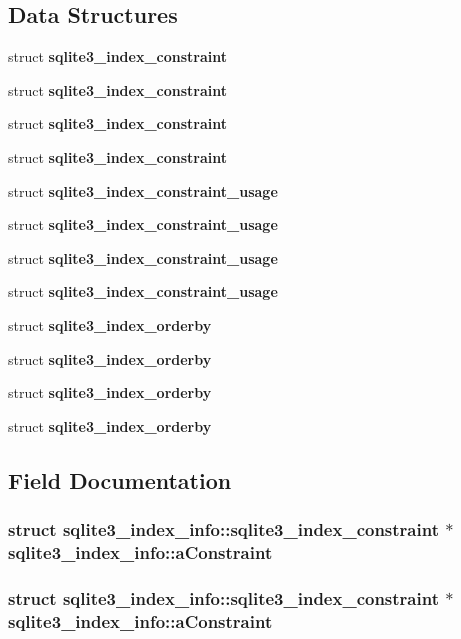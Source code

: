 \subsection*{Data Structures}
\begin{CompactItemize}
\item 
struct \bf{sqlite3\_\-index\_\-constraint}
\item 
struct \bf{sqlite3\_\-index\_\-constraint}
\item 
struct \bf{sqlite3\_\-index\_\-constraint}
\item 
struct \bf{sqlite3\_\-index\_\-constraint}
\item 
struct \bf{sqlite3\_\-index\_\-constraint\_\-usage}
\item 
struct \bf{sqlite3\_\-index\_\-constraint\_\-usage}
\item 
struct \bf{sqlite3\_\-index\_\-constraint\_\-usage}
\item 
struct \bf{sqlite3\_\-index\_\-constraint\_\-usage}
\item 
struct \bf{sqlite3\_\-index\_\-orderby}
\item 
struct \bf{sqlite3\_\-index\_\-orderby}
\item 
struct \bf{sqlite3\_\-index\_\-orderby}
\item 
struct \bf{sqlite3\_\-index\_\-orderby}
\end{CompactItemize}


\subsection{Field Documentation}
\subsubsection{\setlength{\rightskip}{0pt plus 5cm}struct \bf{sqlite3\_\-index\_\-info::sqlite3\_\-index\_\-constraint} $\ast$ \bf{sqlite3\_\-index\_\-info::a\-Constraint}}\label{structsqlite3__index__info_92fe10a4ef2f427913813a7be311be38}


\subsubsection{\setlength{\rightskip}{0pt plus 5cm}struct \bf{sqlite3\_\-index\_\-info::sqlite3\_\-index\_\-constraint} $\ast$ \bf{sqlite3\_\-index\_\-info::a\-Constraint}}\label{structsqlite3__index__info_92fe10a4ef2f427913813a7be311be38}


